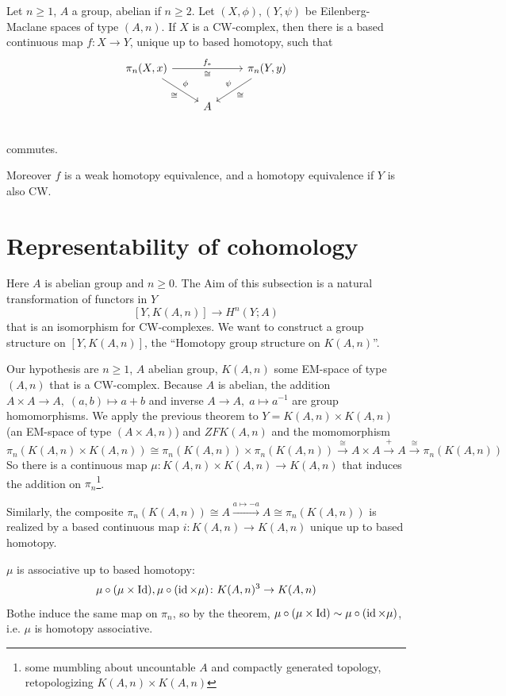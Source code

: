 \documentclass[language=english]{TemplateLecture}
\begin{document}
\begin{corollary}
    Let \(n \geq 1\), \(A\) a group, abelian if \(n \geq 2\). Let \((X, \phi), (Y, \psi)\) be Eilenberg-Maclane spaces of type \((A,n)\). If \(X\) is a CW-complex, then there is a based continuous map \(f\colon X\to Y\), unique up to based homotopy, such that
    \[\begin{tikzcd}
        \pi_n(X,x) \ar[rd, "\phi", "\cong"'] \ar[rr, "f_*", "\cong"'] && \pi_n(Y, y) \ar[dl, "\cong", "\psi"'] \\
        & A & \\
    \end{tikzcd}\]
    commutes.

    Moreover \(f\) is a weak homotopy equivalence, and a homotopy equivalence if \(Y\) is also CW.
\end{corollary}

\section{Representability of cohomology}

Here \(A\) is abelian group and \(n \geq 0\). The Aim of this subsection is a natural transformation of functors in \(Y\)
\[[Y, K(A,n)]\to H^n(Y; A)\]
that is an isomorphism for CW-complexes. We want to construct a group structure on \([Y, K(A,n)]\), the \enquote{Homotopy group structure on \(K(A,n)\)}.

Our hypothesis are \(n\geq 1\), \(A\) abelian group, \(K(A,n)\) some EM-space of type \((A,n)\) that is a CW-complex. Because \(A\) is abelian, the addition \(A\times A\to A, \; (a,b)\mapsto a+b\) and inverse \(A\to A, \; a\mapsto a^{-1}\) are group homomorphisms. We apply the previous theorem to \(Y = K(A,n)\times K(A,n)\) (an EM-space of type \((A\times A, n)\)) and \(Z F K(A,n)\) and the momomorphism
\[\pi_n(K(A,n)\times K(A,n))\cong \pi_n(K(A,n))\times \pi_n(K(A,n)) \xrightarrow{\cong} A\times A \xrightarrow{+} A \xrightarrow{\cong} \pi_n(K(A,n))\]
So there is a continuous map \(\mu\colon K(A,n)\times K(A,n) \to K(A,n)\) that induces the addition on \(\pi_n\)\footnote{some mumbling about uncountable \(A\) and compactly generated topology, retopologizing \(K(A,n)\times K(A,n)\)}.

Similarly, the composite \(\pi_n(K(A,n))\cong A \xrightarrow{a\mapsto -a} A \cong \pi_n(K(A,n))\) is realized by a based continuous map \(i\colon K(A,n)\to K(A,n)\) unique up to based homotopy.

\(\mu\) is associative up to based homotopy:
\[\mu\circ (\mu \times \operatorname{Id}), \mu \circ (\operatorname{id} \times \mu)\colon K(A,n)^3 \to K(A,n) \]
Bothe induce the same map on \(\pi_n\), so by the theorem, \(\mu\circ(\mu \times \operatorname{Id}) \sim \mu\circ (\operatorname{id} \times \mu)\), i.e. \(\mu\) is homotopy associative.
\end{document}
